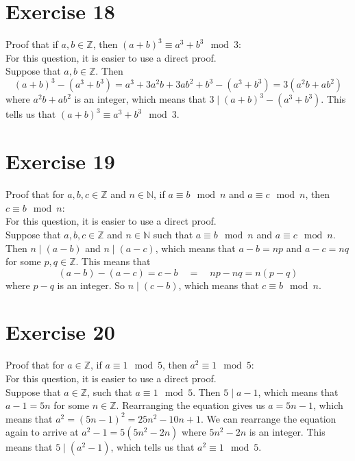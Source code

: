 \documentclass[12pt]{article}
\newcommand{\N}{\mathbb{N}}
\newcommand{\Z}{\mathbb{Z}}
\begin{document}
    \section*{Exercise 18}
    Proof that if $a, b \in \Z$,
    then $(a+b)^3 \equiv a^3 + b^3 \mod 3$: \\
    For this question, it is easier to use a direct proof. \\
    Suppose that $a, b \in \Z$.
    Then
    \[ (a+b)^3 - (a^3 + b^3) = a^3 + 3a^2b + 3ab^2 + b^3 - (a^3 + b^3) 
    = 3(a^2b + ab^2) \]
    where $a^2b + ab^2$ is an integer,
    which means that $3 \mid (a+b)^3 - (a^3 + b^3)$.
    This tells us that $(a+b)^3 \equiv a^3 + b^3 \mod 3$. \\

    \section*{Exercise 19}
    Proof that for $a, b, c \in \Z$ and $n \in \N$,
    if $a \equiv b \mod n$ and $a \equiv c \mod n$,
    then $c \equiv b \mod n$: \\
    For this question, it is easier to use a direct proof. \\
    Suppose that $a, b, c \in \Z$ and $n \in \N$
    such that $a \equiv b \mod n$ and $a \equiv c \mod n$.
    Then $n \mid (a - b)$ and $n \mid (a - c)$,
    which means that $a-b = np$ and $a-c = nq$
    for some $p, q \in \Z$.
    This means that
    \[ (a-b)-(a-c) = c - b  \quad = \quad np - nq = n(p -q) \]
    where $p-q$ is an integer.
    So $n \mid (c - b)$,
    which means that $c \equiv b \mod n$. \\

    \section*{Exercise 20}
    Proof that for $a \in \Z$,
    if $a \equiv 1 \mod 5$,
    then $a^2 \equiv 1 \mod 5$: \\
    For this question, it is easier to use a direct proof. \\
    Suppose that $a \in \Z$,
    such that $a \equiv 1 \mod 5$.
    Then $5 \mid a-1$,
    which means that $a-1 = 5n$ for some $n \in \Z$.
    Rearranging the equation gives us $a = 5n - 1$,
    which means that $a^2 = (5n-1)^2 = 25n^2 -10n + 1$.
    We can rearrange the equation again to arrive
    at $a^2 - 1 = 5(5n^2 - 2n)$
    where $5n^2 - 2n$ is an integer.
    This means that $5 \mid (a^2 - 1)$,
    which tells us that $a^2 \equiv 1  \mod 5$. \\
\end{document}
